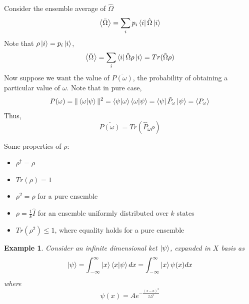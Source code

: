 \documentclass[12pt,a4paper]{report}
\newcommand{\expected}[1]{\left \langle #1 \right \rangle}
\newtheorem{example}{Example}[section]
\begin{document}
Consider the ensemble average of $\hat{\Omega}$
\begin{equation*}
    \expected{\bar{\Omega}} = \sum_i p_i \bra{i}\hat{\Omega}\ket{i}
\end{equation*}
Note that $\rho \ket{i} = p_i \ket{i}$,
\begin{equation*}
    \expected{\bar{\Omega}} = \sum_i \bra{i}\hat{\Omega}\rho\ket{i} = Tr(\hat{\Omega}\rho)
\end{equation*}
Now suppose we want the value of $\overline{P(\omega)}$, the probability of obtaining a particular value of $\omega$. Note that in pure case,
\begin{equation*}
    P(\omega) = \| \bra{\omega}\ket{\psi} \|^2 = \bra{\psi}\ket{\omega}\bra{\omega}\ket{\psi} = \bra{\psi}\hat{P}_\omega\ket{\psi} = \expected{P_\omega}
\end{equation*}
Thus,
\begin{equation*}
    \overline{P(\omega)} = Tr(\hat{P}_\omega\rho)
\end{equation*}

Some properties of $\rho$:
\begin{itemize}
    \item $\rho^\dagger = \rho$
    \item $Tr(\rho) = 1$
    \item $\rho^2 = \rho$ for a pure ensemble
    \item $\rho = \frac{1}{k}\hat{I}$ for an ensemble uniformly distributed over $k$ states
    \item $Tr(\rho^2) \leq 1$, where equality holds for a pure ensemble
\end{itemize}

\newpage

\begin{example}
    Consider an infinite dimensional ket $\ket{\psi}$, expanded in $X$ basis as
    \begin{equation*}
        \ket{\psi} = \int_{-\infty}^{\infty} \ket{x}\bra{x}\ket{\psi} dx = \int_{-\infty}^{\infty} \ket{x} \psi(x) dx
    \end{equation*}
    where
    \begin{equation*}
        \psi(x) = Ae^{-\frac{(x-a)^2}{2\Delta^2}}
    \end{equation*}
\end{example}
\end{document}
